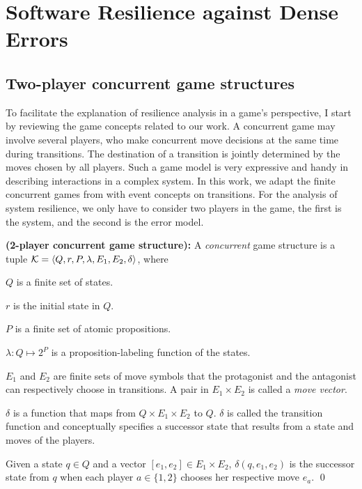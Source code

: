 \chapter{Software Resilience against Dense Errors}
\label{c:resilience}


\section{Two-player concurrent game structures}
To facilitate the explanation of resilience analysis in a game's perspective, I start by reviewing the game concepts related to our work.
A concurrent game may involve several players\label{reply1.multiple.players}, who make concurrent move decisions at the same time during transitions. 
The destination of a transition is jointly determined by the moves chosen by all players.  
Such a game model is very expressive and handy in describing interactions in a complex system.  
In this work, we adapt the finite concurrent games from \cite{AHK02} with event concepts on transitions.
For the analysis of system resilience, we only have to consider two players in the game, the first is the system, and the second is the error model. 


\begin{definition} \label{def.cncgame} 
{\bf (2-player concurrent game structure):}
A {\em concurrent} game structure is a tuple 
${\cal K}=\langle Q,r,P,\lambda,E_1,E_2,\delta\rangle$, where
\begin{list1}
\item $Q$ is a finite set of states. 
\item $r$ is the initial state in $Q$.  
\item $P$ is a finite set of atomic propositions. 
\item $\lambda:Q\mapsto 2^P$ is a proposition-labeling function of the states. 
\item $E_1$ and $E_2$ are finite sets of move symbols that the protagonist and 
the antagonist can respectively choose in transitions.  
A pair in $E_1\times E_2$ is called a {\em move vector}.
\item $\delta$ is a function that maps 
  from $Q\times E_1\times E_2$ to $Q$.  
  $\delta$ is called the transition function and 
  conceptually specifies a successor state 
  that results from a state and moves of the players. 
\label{reply1.for.convenience.succ} 
\end{list1}
Given a state $q\in Q$ and a vector $[e_1,e_2]\in E_1\times E_2$, 
$\delta(q,e_1,e_2)$ is the successor state from 
$q$ when each player $a\in \{1,2\}$ chooses her respective move $e_a$.  
\qed 
\end{definition} 

